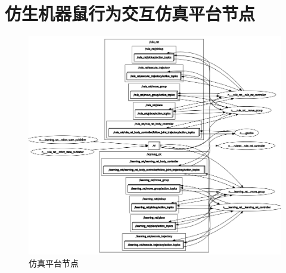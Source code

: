 \newpage
\section{仿生机器鼠行为交互仿真平台节点}\label{appendix_rosgraph}
\begin{figure}[htb]
  \centering
  \includegraphics[width=0.95\linewidth]{images/appendix/rosgraph.png}
  \caption{仿真平台节点}\label{figure_rosgraph}
\end{figure}


\newpage
